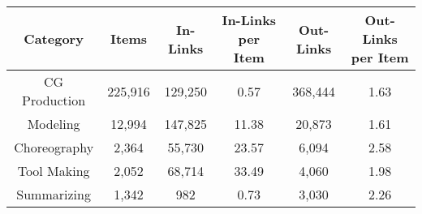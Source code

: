 \begin{tabular}{c|c|c|c|c|c}
Category & Items & In-Links & In-Links per Item & Out-Links & Out-Links per Item \\
\hline
CG Production & 225,916 & 129,250 & 0.57 & 368,444 & 1.63\\
Modeling & 12,994 & 147,825 & 11.38 & 20,873 & 1.61\\
Choreography & 2,364 & 55,730 & 23.57 & 6,094 & 2.58\\
Tool Making & 2,052 & 68,714 & 33.49 & 4,060 & 1.98\\
Summarizing & 1,342 & 982 & 0.73 & 3,030 & 2.26
\end{tabular}